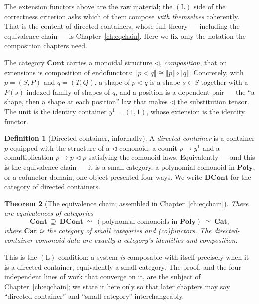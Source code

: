 \documentclass[11pt]{report}
\theoremstyle{plain}
\newtheorem{theorem}{Theorem}[chapter]
\theoremstyle{definition}
\newtheorem{definition}[theorem]{Definition}
\theoremstyle{remark}
\newcommand{\Cont}{\mathbf{Cont}}
\newcommand{\DCont}{\mathbf{DCont}}
\newcommand{\Cat}{\mathbf{Cat}}
\newcommand{\Poly}{\mathbf{Poly}}
\newcommand{\tri}{\triangleleft}
\newcommand{\den}[1]{\llbracket #1 \rrbracket}
\newcommand{\iso}{\cong}
\begin{document}
The extension functors above are the raw material; the $(\mathrm{L})$ side of the
correctness criterion asks which of them compose \emph{with themselves}
coherently. That is the content of directed containers, whose full theory ---
including the equivalence chain --- is Chapter~\ref{ch:eqchain}. Here we fix only
the notation the composition chapters need.

The category $\Cont$ carries a monoidal structure $\tri$, \emph{composition},
that on extensions is composition of endofunctors:
$\den{p\tri q}\iso\den{p}\circ\den{q}$. Concretely, with $p=(S,P)$ and
$q=(T,Q)$, a shape of $p\tri q$ is a shape $s\in S$ together with a $P(s)$-indexed
family of shapes of $q$, and a position is a dependent pair --- the ``a shape,
then a shape at each position'' law that makes $\tri$ the substitution tensor. The
unit is the identity container $y^{1}=(1,1)$, whose extension is the identity
functor.

\begin{definition}[Directed container, informally]
\label{def:prelim-dcont}
A \emph{directed container} is a container $p$ equipped with the structure of a
$\tri$-comonoid: a counit $p\to y^1$ and a comultiplication $p\to p\tri p$
satisfying the comonoid laws. Equivalently --- and this is the equivalence chain
--- it is a small category, a polynomial comonoid in $\Poly$, or a cofunctor
domain, one object presented four ways. We write $\DCont$ for the category of
directed containers.
\end{definition}

\begin{theorem}[The equivalence chain; assembled in Chapter~\ref{ch:eqchain}]
\label{thm:prelim-chain}
There are equivalences of categories
\[
  \Cont\ \supseteq\ \DCont\ \simeq\ (\text{polynomial comonoids in }\Poly)\ \simeq\ \Cat,
\]
where $\Cat$ is the category of small categories and (co)functors. The
directed-container comonoid data are exactly a category's identities and
composition.
\end{theorem}

This is the $(\mathrm{L})$ condition: a system \emph{is} composable-with-itself
precisely when it is a directed container, equivalently a small category. The
proof, and the four independent lines of work that converge on it, are the subject
of Chapter~\ref{ch:eqchain}; we state it here only so that later chapters may say
``directed container'' and ``small category'' interchangeably.

\end{document}
